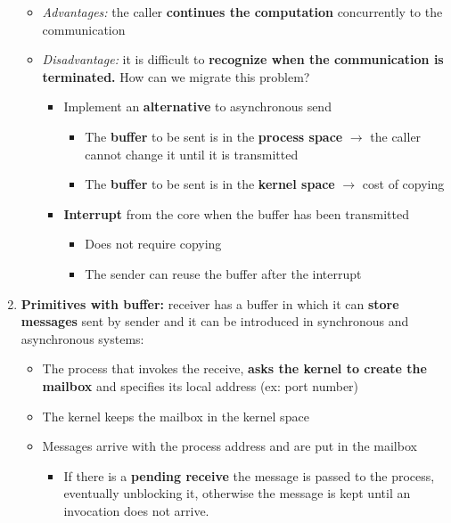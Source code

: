 \begin{enumerate}
\begin{itemize}
            \item \textit{Advantages:} the caller \textbf{continues the computation} concurrently to the communication
            \item \textit{Disadvantage:} it is difficult to \textbf{recognize when the communication is terminated.} How can we migrate this problem?
                \begin{itemize}
                    \item Implement an \textbf{alternative} to asynchronous send
                        \begin{itemize}
                            \item The \textbf{buffer} to be sent is in the \textbf{process space} \(\rightarrow\) the caller cannot change it until it is transmitted
                            \item The \textbf{buffer} to be sent is in the \textbf{kernel space} \(\rightarrow\) cost of copying
                        \end{itemize}
                    \item \textbf{Interrupt} from the core when the buffer has been transmitted
                        \begin{itemize}
                            \item Does not require copying
                            \item The sender can reuse the buffer after the interrupt
                        \end{itemize}
                \end{itemize}
        \end{itemize}
    \item \textbf{Primitives with buffer:} receiver has a buffer in which it can \textbf{store messages} sent by sender and it can be introduced in synchronous and asynchronous systems:
        \begin{itemize}
            \item The process that invokes the receive, \textbf{asks the kernel to create the mailbox} and specifies its local address (ex: port number)
            \item The kernel keeps the mailbox in the kernel space
            \item Messages arrive with the process address and are put in the mailbox
                \begin{itemize}
                    \item If there is a \textbf{pending receive} the message is passed to the process, eventually unblocking it, otherwise the message is kept until an invocation does not arrive.

\end{itemize}
\end{itemize}
\end{enumerate}
